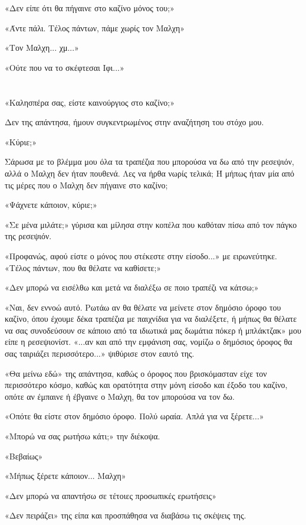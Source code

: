 \documentclass[12pt,twoside, openany]{book}
\begin{document}
«Δεν είπε ότι θα πήγαινε στο καζίνο μόνος του;»

«Άντε πάλι. Τέλος πάντων, πάμε χωρίς τον Μαλχη»

«Τον Μαλχη... χμ...»

«Ούτε που να το σκέφτεσαι Ιφι...»

\chapter{}

«Καλησπέρα σας, είστε καινούργιος στο καζίνο;»

Δεν της απάντησα, ήμουν συγκεντρωμένος στην αναζήτηση του στόχο μου.

«Κύριε;»

Σάρωσα με το βλέμμα μου όλα τα τραπέζια που μπορούσα να δω από την ρεσεψιόν, αλλά ο Μαλχη δεν ήταν πουθενά. Λες να ήρθα νωρίς τελικά; Ή μήπως ήταν μία από τις μέρες που ο Μαλχη δεν πήγαινε στο καζίνο;

«Ψάχνετε κάποιον, κύριε;»

«Σε μένα μιλάτε;» γύρισα και μίλησα στην κοπέλα που καθόταν πίσω από τον πάγκο της ρεσεψιόν.

«Προφανώς, αφού είστε ο μόνος που στέκεστε στην είσοδο...» με ειρωνεύτηκε. «Τέλος πάντων, που θα θέλατε να καθίσετε;»

«Δεν μπορώ να εισέλθω και μετά να διαλέξω σε ποιο τραπέζι να κάτσω;»

«Ναι, δεν εννοώ αυτό. Ρωτάω αν θα θέλατε να μείνετε στον δημόσιο όροφο του καζίνο, όπου έχουμε δέκα τραπέζια με παιχνίδια για να διαλέξετε, ή μήπως θα θέλατε να σας συνοδεύσουν σε κάποιο από τα ιδιωτικά μας δωμάτια πόκερ ή μπλάκτζακ» μου είπε η ρεσεψιονίστ. «...αν και από την εμφάνιση σας, νομίζω ο δημόσιος όροφος θα σας ταιριάζει περισσότερο...» ψιθύρισε στον εαυτό της.

«Θα μείνω εδώ» της απάντησα, καθώς ο όροφος που βρισκόμασταν είχε τον περισσότερο κόσμο, καθώς και ορατότητα στην μόνη είσοδο και έξοδο του καζίνο, οπότε αν έμπαινε ή έβγαινε ο Μαλχη, θα τον μπορούσα να τον δω.

«Οπότε θα είστε στον δημόσιο όροφο. Πολύ ωραία. Απλά για να ξέρετε...»

«Μπορώ να σας ρωτήσω κάτι;» την διέκοψα.

«Βεβαίως»

«Μήπως ξέρετε κάποιον... Μαλχη»

«Δεν μπορώ να απαντήσω σε τέτοιες προσωπικές ερωτήσεις»

«Δεν πειράζει» της είπα και προσπάθησα να διαβάσω τις σκέψεις της.
\end{document}
